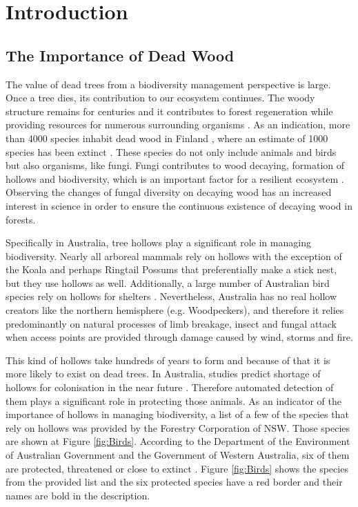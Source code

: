 \documentclass{subfiles}
\begin{document}
\section{Introduction}

\subsection{The Importance of Dead Wood}

\par The value of dead trees from a biodiversity management perspective is large. Once a tree dies, its contribution to our ecosystem continues. The woody structure remains for centuries and it contributes to forest regeneration while providing resources for numerous surrounding organisms \cite{Franklin1987}. As an indication, more than 4000 species inhabit dead wood in Finland \cite{Siitonen2001}, where an estimate of 1000 species has been extinct \cite{Hanski2000}. These species do not only include animals and birds but also organisms, like fungi. Fungi contributes to wood decaying, formation of hollows and biodiversity, which is an important factor for a resilient ecosystem \cite{Peterson2000}. Observing the changes of fungal diversity on decaying wood has an increased interest in science  \cite{Abrego2011} \cite{Stokland2011} \cite{Lonsdale2008} in order to ensure the continuous existence of decaying wood in forests. 




\par Specifically in Australia, tree hollows play a significant role in managing biodiversity. Nearly all arboreal mammals rely on hollows with the exception of the Koala and perhaps Ringtail Possums that preferentially make a stick nest, but they use hollows as well. Additionally, a large number of Australian bird species rely on hollows for shelters \cite{Gibbons2002}. Nevertheless, Australia has no real hollow creators like the northern hemisphere (e.g. Woodpeckers), and therefore it relies predominantly on natural processes of limb breakage, insect and fungal attack when access points are provided through damage caused by wind, storms and fire. 
\par This kind of hollows take hundreds of years to form and because of that it is more likely to exist on dead trees. In Australia, studies predict shortage of hollows for colonisation in the near future \cite{Lindenmayer2010} \cite{Goldingay2009}. Therefore automated detection of them plays a significant role in protecting those animals. As an indicator of the importance of hollows in managing biodiversity, a list of a few of the species that rely on hollows was provided by the Forestry Corporation of NSW. Those species are shown at Figure \ref{fig:Birds}. According to the Department of the Environment of Australian Government and the Government of Western Australia, six of them are  protected, threatened or close to extinct \cite{AustraliaExtinct1999}  \cite{AustraliaExtince2015}. Figure \ref{fig:Birds} shows the species from the provided list and the six protected species have a red border and their names are bold in the description. 
\end{document}
